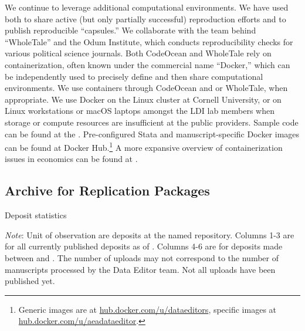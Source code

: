 We continue to leverage additional computational environments. We have used  \citep{clyburne-sherin_computational_2019} both to share active (but only partially successful) reproduction efforts and to publish reproducible ``capsules.'' We collaborate with the team behind ``WholeTale'' \citep{BrinckmanFutureGener.Comput.Syst.2018} and the Odum Institute, which conducts reproducibility checks for various political science journals. Both {{CodeOcean}} and WholeTale rely on containerization, often known under the commercial name ``Docker,'' which can be independently used to precisely define and then share computational environments. We use containers through CodeOcean and or WholeTale, when appropriate. We use Docker on the Linux cluster at Cornell University, or on Linux workstations or macOS laptops amongst the LDI lab members when storage or compute resources are insufficient at the public providers. Sample code  can be found at the . Pre-configured Stata and manuscript-specific Docker images can be found at Docker Hub.\footnote{Generic images are at \href{https://hub.docker.com/u/dataeditors}{hub.docker.com/u/dataeditors}, specific images at \href{https://hub.docker.com/u/aeadataeditor}{hub.docker.com/u/aeadataeditor}.} A more expansive overview of containerization issues in economics can be found at \citet{aea_data_editor_use_2021}.


\subsection{Archive for Replication Packages}


\begin{table}[t]
    \centering
    \caption{Deposit statistics}
    \label{tab:webstats}
     \begin{threeparttable}
     
 
    \begin{tablenotes}
    \footnotesize
    \item[] \textit{Note}: Unit of observation are deposits at the named repository. Columns 1-3 are for all currently published deposits as of \pkglastday{}. Columns 4-6 are for deposits made between \firstday{} and \pkglastday{}. The number of uploads may not correspond to the number of manuscripts processed by the Data Editor team. Not all uploads have been published yet. 
    \end{tablenotes}
    \end{threeparttable}
\end{table}


